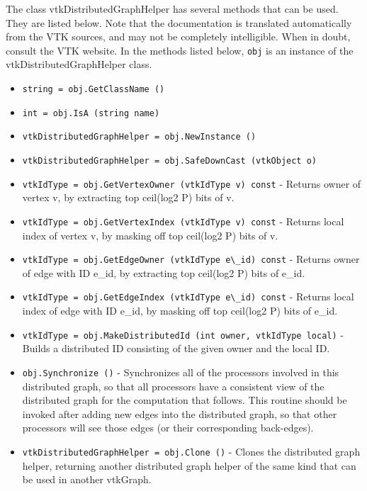 The class vtkDistributedGraphHelper has several methods that can be used.
  They are listed below.
Note that the documentation is translated automatically from the VTK sources,
and may not be completely intelligible.  When in doubt, consult the VTK website.
In the methods listed below, \verb|obj| is an instance of the vtkDistributedGraphHelper class.
\begin{itemize}
\item  \verb|string = obj.GetClassName ()|

\item  \verb|int = obj.IsA (string name)|

\item  \verb|vtkDistributedGraphHelper = obj.NewInstance ()|

\item  \verb|vtkDistributedGraphHelper = obj.SafeDownCast (vtkObject o)|

\item  \verb|vtkIdType = obj.GetVertexOwner (vtkIdType v) const| -  Returns owner of vertex v, by extracting top ceil(log2 P) bits of v.

\item  \verb|vtkIdType = obj.GetVertexIndex (vtkIdType v) const| -  Returns local index of vertex v, by masking off top ceil(log2 P) bits of v.

\item  \verb|vtkIdType = obj.GetEdgeOwner (vtkIdType e\_id) const| -  Returns owner of edge with ID e\_id, by extracting top ceil(log2 P) bits of e\_id.

\item  \verb|vtkIdType = obj.GetEdgeIndex (vtkIdType e\_id) const| -  Returns local index of edge with ID e\_id, by masking off top ceil(log2 P)
 bits of e\_id.

\item  \verb|vtkIdType = obj.MakeDistributedId (int owner, vtkIdType local)| -  Builds a distributed ID consisting of the given owner and the local ID.

\item  \verb|obj.Synchronize ()| -  Synchronizes all of the processors involved in this distributed
 graph, so that all processors have a consistent view of the
 distributed graph for the computation that follows. This routine
 should be invoked after adding new edges into the distributed
 graph, so that other processors will see those edges (or their
 corresponding back-edges).

\item  \verb|vtkDistributedGraphHelper = obj.Clone ()| -  Clones the distributed graph helper, returning another
 distributed graph helper of the same kind that can be used in
 another vtkGraph.

\end{itemize}
